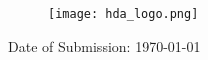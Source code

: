 \begin{titlepage}
%


\begin{figure}[!b]

\centering
\texttt{[image: hda\_logo.png]}\hfill
\end{figure}

	
	
	\vfill\vfill\vfill %
	
	{Date of Submission: \large\today} %
	
	
	 
	
	\vfill %
	
\end{titlepage}
